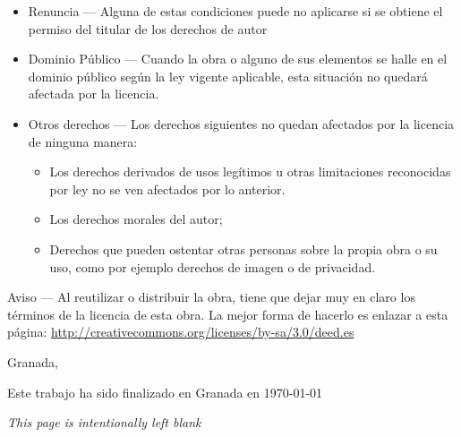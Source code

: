 \begin{declaration}
\begin{itemize}
\item Renuncia — Alguna de estas condiciones puede no aplicarse si se obtiene el permiso del titular de los derechos de autor
\item Dominio Público — Cuando la obra o alguno de sus elementos se halle en el dominio público según la ley vigente aplicable, esta situación no quedará afectada por la licencia.
\item Otros derechos — Los derechos siguientes no quedan afectados por la licencia de ninguna manera:
\begin{itemize}
\item Los derechos derivados de usos legítimos u otras limitaciones reconocidas por ley no se ven afectados por lo anterior.
\item Los derechos morales del autor;
\item Derechos que pueden ostentar otras personas sobre la propia obra o su uso, como por ejemplo derechos de imagen o de privacidad.
\end{itemize}
\end{itemize}

Aviso — Al reutilizar o distribuir la obra, tiene que dejar muy en claro los términos de la licencia de esta obra. La mejor forma de hacerlo es enlazar a esta página: \url{http://creativecommons.org/licenses/by-sa/3.0/deed.es}


\vspace{10mm}

Granada,




\end{declaration}




\thispagestyle{empty}

\hfill
\vfill
\medskip

\begin{center}
\noindent
Este trabajo ha sido finalizado en Granada en
\today 
\end{center}

\vfill
\medskip
\vspace{1cm}
\bigskip



\clearpage
\thispagestyle{empty}

\hfill
\vfill
\medskip

\begin{center}
\textit{This page is intentionally left blank}
\end{center}

\vfill
\medskip
\vspace{1cm}
\bigskip


